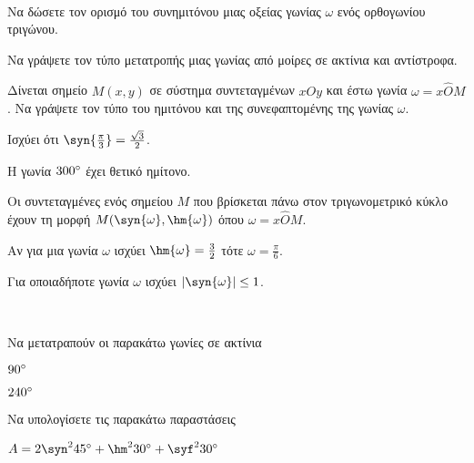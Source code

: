 \documentclass[twoside,nofonts,ektypwsh]{frontisthrio-diag}
\begin{document}
\begin{thema}
\item\mbox{}\\\vspace{-7mm}
\begin{erwthma}
\item Να δώσετε τον ορισμό του συνημιτόνου μιας οξείας γωνίας $ \omega $ ενός ορθογωνίου τριγώνου.
\item Να γράψετε τον τύπο μετατροπής μιας γωνίας από μοίρες σε ακτίνια και αντίστροφα.
\item Δίνεται σημείο $ M(x,y) $ σε σύστημα συντεταγμένων $ xOy $ και έστω γωνία $ \omega=x\hat{O}M $. Να γράψετε τον τύπο του ημιτόνου και της συνεφαπτομένης της γωνίας $ \omega $.
\item \swstolathospan
\begin{alist}
\item Ισχύει ότι $ \syn{\frac{\pi}{3}}=\frac{\sqrt{3}}{2} $.
\item Η γωνία $ 300\degree $ έχει θετικό ημίτονο.
\item Οι συντεταγμένες ενός σημείου $ M $ που βρίσκεται πάνω στον τριγωνομετρικό κύκλο έχουν τη μορφή $ M(\syn{\omega},\hm{\omega}) $ όπου $ \omega=x\hat{O}M $.
\item Αν για μια γωνία $ \omega $ ισχύει $ \hm{\omega}=\frac{3}{2} $ τότε $ \omega=\frac{\pi}{6} $.
\item Για οποιαδήποτε γωνία $ \omega $ ισχύει $ |\syn{\omega}|\leq 1 $.
\end{alist}
\end{erwthma}
\item\mbox{}\\\vspace{-7mm}
\begin{erwthma}
\item Να μετατραπούν οι παρακάτω γωνίες σε ακτίνια
\begin{multicols}{2}
\begin{alist}
\item $ 90\degree $
\item $ 240\degree $
\end{alist}
\end{multicols}
\item Να υπολογίσετε τις παρακάτω παραστάσεις
\begin{alist}
\item $ A=2\syn^2{45\degree}+\hm^2{30\degree}+\syf^2{30\degree} $

\end{alist}
\end{erwthma}
\end{thema}
\end{document}
